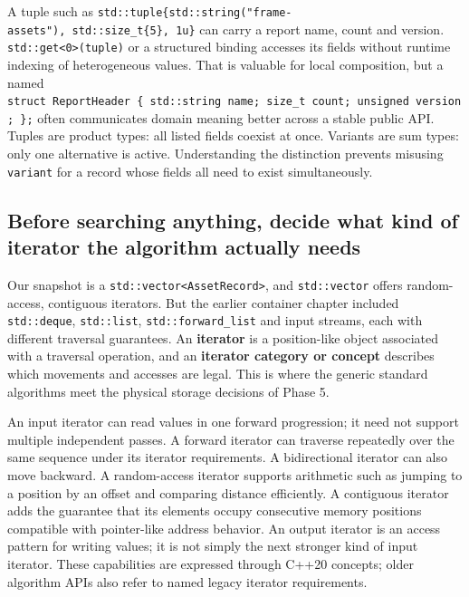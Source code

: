 A tuple such as \texttt{std::tuple\{std::string("frame-assets"),\ std::size\_t\{5\},\ 1u\}} can carry a report name, count and version. \texttt{std::get\textless{}0\textgreater{}(tuple)} or a structured binding accesses its fields without runtime indexing of heterogeneous values. That is valuable for local composition, but a named \texttt{struct\ ReportHeader\ \{\ std::string\ name;\ size\_t\ count;\ unsigned\ version;\ \};} often communicates domain meaning better across a stable public API. Tuples are product types: all listed fields coexist at once. Variants are sum types: only one alternative is active. Understanding the distinction prevents misusing \texttt{variant} for a record whose fields all need to exist simultaneously.

\subsection{Before searching anything, decide what kind of iterator the algorithm actually needs}\label{01-foundations-i-ch006-before-searching-anything-decide-what-kind-of-iterator-the-algorithm-actually-needs}

Our snapshot is a \texttt{std::vector\textless{}AssetRecord\textgreater{}}, and \texttt{std::vector} offers random-access, contiguous iterators. But the earlier container chapter included \texttt{std::deque}, \texttt{std::list}, \texttt{std::forward\_list} and input streams, each with different traversal guarantees. An \textbf{iterator} is a position-like object associated with a traversal operation, and an \textbf{iterator category or concept} describes which movements and accesses are legal. This is where the generic standard algorithms meet the physical storage decisions of Phase 5.

An input iterator can read values in one forward progression; it need not support multiple independent passes. A forward iterator can traverse repeatedly over the same sequence under its iterator requirements. A bidirectional iterator can also move backward. A random-access iterator supports arithmetic such as jumping to a position by an offset and comparing distance efficiently. A contiguous iterator adds the guarantee that its elements occupy consecutive memory positions compatible with pointer-like address behavior. An output iterator is an access pattern for writing values; it is not simply the next stronger kind of input iterator. These capabilities are expressed through C++20 concepts; older algorithm APIs also refer to named legacy iterator requirements.

